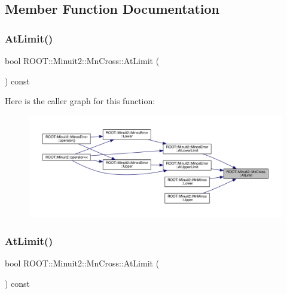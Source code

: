 \subsection{Member Function Documentation}
\mbox{\label{classROOT_1_1Minuit2_1_1MnCross_a01119708c6c9aa2a5b16222705cad954}} 
\subsubsection{\texorpdfstring{AtLimit()}{AtLimit()}\hspace{0.1cm}{\footnotesize\ttfamily [1/2]}}
{\footnotesize\ttfamily bool R\+O\+O\+T\+::\+Minuit2\+::\+Mn\+Cross\+::\+At\+Limit (\begin{DoxyParamCaption}{ }\end{DoxyParamCaption}) const\hspace{0.3cm}{\ttfamily [inline]}}

Here is the caller graph for this function\+:\nopagebreak
\begin{figure}[H]
\begin{center}
\leavevmode
\includegraphics[width=350pt]{d3/db2/classROOT_1_1Minuit2_1_1MnCross_a01119708c6c9aa2a5b16222705cad954_icgraph}
\end{center}
\end{figure}
\mbox{\label{classROOT_1_1Minuit2_1_1MnCross_a01119708c6c9aa2a5b16222705cad954}} 
\subsubsection{\texorpdfstring{AtLimit()}{AtLimit()}\hspace{0.1cm}{\footnotesize\ttfamily [2/2]}}
{\footnotesize\ttfamily bool R\+O\+O\+T\+::\+Minuit2\+::\+Mn\+Cross\+::\+At\+Limit (\begin{DoxyParamCaption}{ }\end{DoxyParamCaption}) const\hspace{0.3cm}{\ttfamily [inline]}}

